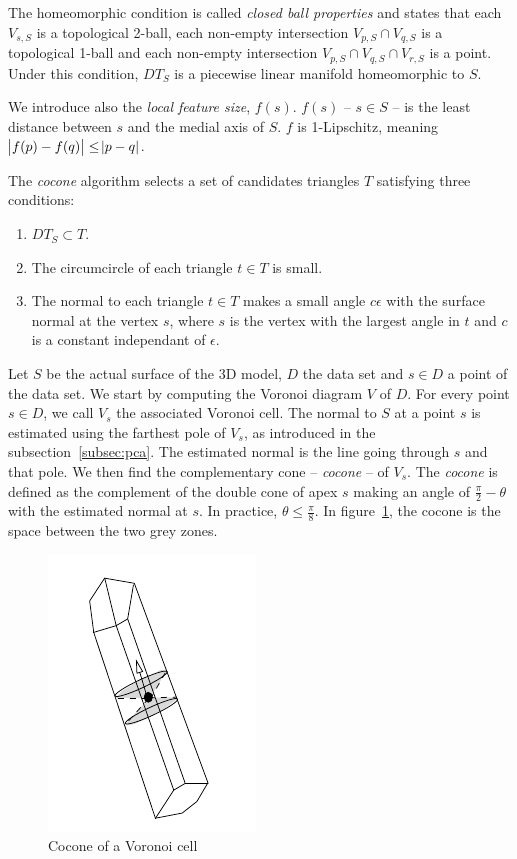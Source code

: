 \documentclass[12pt]{article}
\begin{document}
The homeomorphic condition is called \emph{closed ball properties} and states that each $V_{s,S}$ is a topological 2-ball, each non-empty intersection $V_{p,S}\cap V_{q,S}$ is a topological 1-ball and each non-empty intersection $V_{p,S}\cap V_{q,S}\cap V_{r,S}$ is a point. Under this condition, $DT_S$ is a piecewise linear manifold homeomorphic to $S$.

We introduce also the \emph{local feature size}, $f(s)$. $f(s)$ -- $s \in S$ -- is the least distance between $s$ and the medial axis of $S$. $f$ is 1-Lipschitz, meaning $\abs{f(p) - f(q)}\le\abs{p - q}$.

The \emph{cocone} algorithm selects a set of candidates triangles $T$ satisfying three conditions:
\begin{enumerate}
\item $DT_S \subset T$.
\item The circumcircle of each triangle $t \in T$ is small.
\item The normal to each triangle $t \in T$ makes a small angle $c\epsilon$ with the surface normal at the vertex $s$, where $s$ is the vertex with the largest angle in $t$ and $c$ is a constant independant of $\epsilon$.
\end{enumerate}

Let $S$ be the actual surface of the 3D model, $D$ the data set and $s \in D$ a point of the data set. We start by computing the Voronoi diagram $V$ of $D$. For every point $s \in D$, we call $V_s$ the associated Voronoi cell. The normal to $S$ at a point $s$ is estimated using the farthest pole of $V_s$, as introduced in the subsection~\ref{subsec:pca}. The estimated normal is the line going through $s$ and that pole. We then find the complementary cone -- \emph{cocone} -- of $V_s$. The \emph{cocone} is defined as the complement of the double cone of apex $s$ making an angle of $\frac{\pi}{2}-\theta$ with the estimated normal at $s$. In practice, $\theta\le\frac{\pi}{8}$. In figure~\ref{coc}, the cocone is the space between the two grey zones.

\begin{figure}[h]
  \centering
  \includegraphics[scale=0.3]{Cocone.png}
  \caption{\label{coc} Cocone of a Voronoi cell}
\end{figure}
\end{document}
